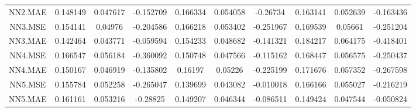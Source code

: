 \begin{longtable}[t]{cccccccccc}
NN2.MAE & 0.148149 & 0.047617 & -0.152709 & 0.166334 & 0.054058 & -0.26734 & 0.163141 & 0.052639 & -0.163436\\
NN3.MSE & 0.154141 & 0.04976 & -0.204586 & 0.166218 & 0.053402 & -0.251967 & 0.169539 & 0.05661 & -0.251204\\
NN3.MAE & 0.142464 & 0.043771 & -0.059594 & 0.154233 & 0.048682 & -0.141321 & 0.184217 & 0.064175 & -0.418401\\
NN4.MSE & 0.166547 & 0.056184 & -0.360092 & 0.150748 & 0.047566 & -0.115162 & 0.168447 & 0.056575 & -0.250437\\
NN4.MAE & 0.150167 & 0.046919 & -0.135802 & 0.16197 & 0.05226 & -0.225199 & 0.171676 & 0.057352 & -0.267598\\
NN5.MSE & 0.155784 & 0.052258 & -0.265047 & 0.139699 & 0.043082 & -0.010018 & 0.166166 & 0.055027 & -0.216219\\
NN5.MAE & 0.161161 & 0.053216 & -0.28825 & 0.149207 & 0.046344 & -0.086511 & 0.149424 & 0.047544 & -0.050824\\*
\end{longtable}
\endgroup{}
